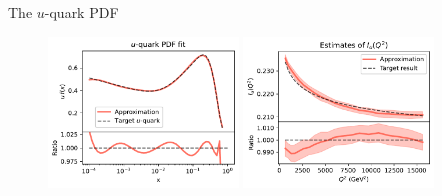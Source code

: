 \documentclass[8pt, xcolor={svgnames}, hyperref={linkcolor=black}]{beamer}
\begin{document}
\begin{frame}{The $u$-quark PDF}
\begin{multicols}{2}
\begin{figure}  
\centering
    \includegraphics[width=0.45\textwidth]{figures/uquark.pdf}
    \includegraphics[width=0.45\textwidth]{figures/uquark2d.pdf}
\end{figure}
\end{multicols}

\end{frame}
\end{document}
